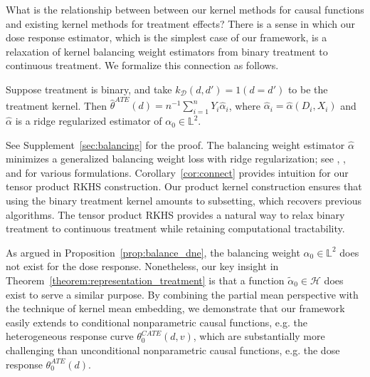 
What is the relationship between between our kernel methods for causal functions and existing kernel methods for treatment effects? There is a sense in which our dose response estimator, which is the simplest case of our framework, is a relaxation of kernel balancing weight estimators from binary treatment to continuous treatment. We formalize this connection as follows.

\begin{corollary}\label{cor:connect}
Suppose treatment is binary, and take $k_{\mathcal{D}}(d,d')=1(d=d')$ to be the treatment kernel. Then $\hat{\theta}^{ATE}(d)=n^{-1}\sum_{i=1}^n Y_i \hat{\alpha}_i$, where $\hat{\alpha}_i=\hat{\alpha}(D_i,X_i)$ and $\hat{\alpha}$ is a ridge regularized estimator of $\alpha_0 \in \mathbb{L}^2$.
\end{corollary}

See Supplement~\ref{sec:balancing} for the proof. The balancing weight estimator $\hat{\alpha}$ minimizes a generalized balancing weight loss with ridge regularization; see \cite[eq. 8]{kallus2020generalized}, \cite[eq. 1]{hirshberg2019minimax}, and \cite[Definition 3.2]{singh2021debiased} for various formulations. Corollary~\ref{cor:connect} provides intuition for our tensor product RKHS construction. Our product kernel construction ensures that using the binary treatment kernel amounts to subsetting, which recovers previous algorithms. The tensor product RKHS provides a natural way to relax binary treatment to continuous treatment while retaining computational tractability.

As argued in Proposition~\ref{prop:balance_dne}, the balancing weight $\alpha_0\in \mathbb{L}^2$ does not exist for the dose response. Nonetheless, our key insight in Theorem~\ref{theorem:representation_treatment} is that a function $\tilde{\alpha}_0\in\mathcal{H}$ does exist to serve a similar purpose. By combining the partial mean perspective with the technique of kernel mean embedding, we demonstrate that our framework easily extends to conditional nonparametric causal functions, e.g. the heterogeneous response curve $\theta_0^{CATE}(d,v)$, which are substantially more challenging than unconditional nonparametric causal functions, e.g. the dose response $\theta^{ATE}_0(d)$.


